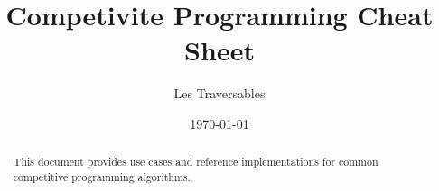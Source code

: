 \documentclass[11pt]{amsart}
\title{Competivite Programming Cheat Sheet}
\author{Les Traversables}
\date{\today}
\begin{document}
\begin{abstract}
    This document provides use cases and reference implementations for common competitive programming algorithms. 
\end{abstract}

\maketitle
\end{document}
